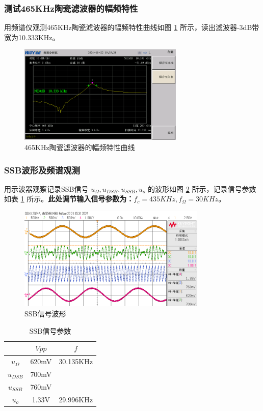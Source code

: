 \documentclass[UTF8]{ctexart}
\begin{document}
\subsubsection{测试465KHz陶瓷滤波器的幅频特性}
\noindent 用频谱仪观测465KHz陶瓷滤波器的幅频特性曲线如图 \ref{fig:30} 所示，读出滤波器-3dB带宽为10.333KHz。
\begin{figure}[H]
    \centering
    \includegraphics[width=0.7\textwidth]{pics/30.png}
    \caption{465KHz陶瓷滤波器的幅频特性曲线}\label{fig:30}
\end{figure}
\subsubsection{SSB波形及频谱观测}
用示波器观察记录SSB信号 $u_\Omega,u_{DSB},u_{SSB},u_o$ 的波形如图 \ref{fig:31} 所示，记录信号参数如表 \ref{tab:4} 所示。\textbf{此处调节输入信号参数为：$f_c=435KHz,f_\Omega=30KHz$}。
\begin{figure}[H]
    \centering
    \includegraphics[width=0.8\textwidth]{pics/31.png}
    \caption{SSB信号波形}\label{fig:31}
\end{figure}


\begin{table}[H]
    \centering
    \vspace{-1em}
    \caption{SSB信号参数}
    \label{tab:4}
    \begin{tabular}{c|c|c}
    \hline
               & $Vpp$ & $f$       \\ \hline
    $u_\Omega$ & 620mV & 30.135KHz \\ \hline
    $u_{DSB}$  & 700mV &           \\ \hline
    $u_{SSB}$  & 760mV &           \\ \hline
    $u_o$      & 1.33V & 29.996KHz \\ \hline
    \end{tabular}
\end{table}
\end{document}
